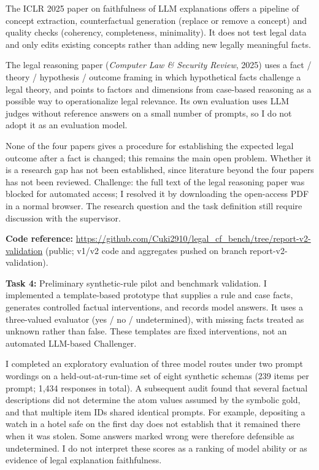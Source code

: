 \documentclass[11pt,a4paper]{article}
\begin{document}
The ICLR 2025 paper on faithfulness of LLM explanations offers a pipeline of concept extraction, counterfactual generation (replace or remove a concept) and quality checks (coherency, completeness, minimality). It does not test legal data and only edits existing concepts rather than adding new legally meaningful facts.

The legal reasoning paper (\textit{Computer Law \& Security Review}, 2025) uses a fact / theory / hypothesis / outcome framing in which hypothetical facts challenge a legal theory, and points to factors and dimensions from case-based reasoning as a possible way to operationalize legal relevance. Its own evaluation uses LLM judges without reference answers on a small number of prompts, so I do not adopt it as an evaluation model.

None of the four papers gives a procedure for establishing the expected legal outcome after a fact is changed; this remains the main open problem. Whether it is a research gap has not been established, since literature beyond the four papers has not been reviewed. Challenge: the full text of the legal reasoning paper was blocked for automated access; I resolved it by downloading the open-access PDF in a normal browser. The research question and the task definition still require discussion with the supervisor.

\textbf{Code reference:} \url{https://github.com/Cuki2910/legal_cf_bench/tree/report-v2-validation} (public; v1/v2 code and aggregates pushed on branch report-v2-validation).

\textbf{Task 4: } Preliminary synthetic-rule pilot and benchmark validation. I implemented a template-based prototype that supplies a rule and case facts, generates controlled factual interventions, and records model answers. It uses a three-valued evaluator (yes / no / undetermined), with missing facts treated as unknown rather than false. These templates are fixed interventions, not an automated LLM-based Challenger.

I completed an exploratory evaluation of three model routes under two prompt wordings on a held-out-at-run-time set of eight synthetic schemas (239 items per prompt; 1,434 responses in total). A subsequent audit found that several factual descriptions did not determine the atom values assumed by the symbolic gold, and that multiple item IDs shared identical prompts. For example, depositing a watch in a hotel safe on the first day does not establish that it remained there when it was stolen. Some answers marked wrong were therefore defensible as undetermined. I do not interpret these scores as a ranking of model ability or as evidence of legal explanation faithfulness.
\end{document}
